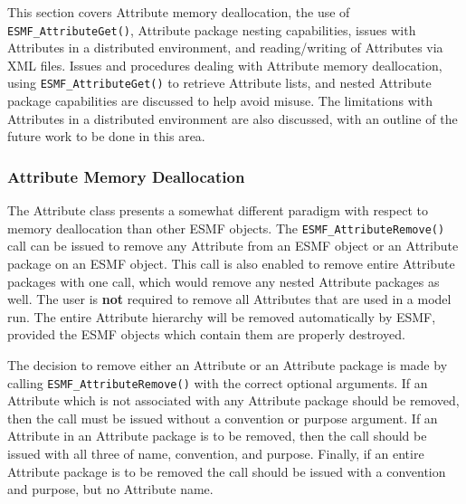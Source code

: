 %

This section covers Attribute memory deallocation, the use of {\tt ESMF\_AttributeGet()}, Attribute package nesting capabilities, issues with Attributes in a distributed environment, and reading/writing of Attributes via XML files.  Issues and procedures dealing with Attribute memory deallocation, using {\tt ESMF\_AttributeGet()} to retrieve Attribute lists, and nested Attribute package capabilities are discussed to help avoid misuse.  The limitations with Attributes in a distributed environment are also discussed, with an outline of the future work to be done in this area. 

\subsubsection{Attribute Memory Deallocation}

The Attribute class presents a somewhat different paradigm with respect to memory deallocation than other ESMF objects.  The {\tt ESMF\_AttributeRemove()} call can be issued to remove any Attribute from an ESMF object or an Attribute package on an ESMF object.  This call is also enabled to remove entire Attribute packages with one call, which would remove any nested Attribute packages as well.  The user is {\bf not} required to remove all Attributes that are used in a model run.  The entire Attribute hierarchy will be removed automatically by ESMF, provided the ESMF objects which contain them are properly destroyed.  

The decision to remove either an Attribute or an Attribute package is made by calling {\tt ESMF\_AttributeRemove()} with the correct optional arguments.  If an Attribute which is not associated with any Attribute package should be removed, then the call must be issued without a convention or purpose argument.  If an Attribute in an Attribute package is to be removed, then the call should be issued with all three of name, convention, and purpose.  Finally, if an entire Attribute package is to be removed the call should be issued with a convention and purpose, but no Attribute name.

